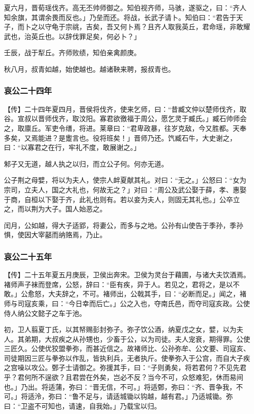 \documentclass[]{article}
\begin{document}
夏六月，晋荀瑶伐齐。高无丕帅师御之。知伯视齐师，马骇，遂驱之，曰：``齐人知余旗，其谓余畏而反也。」乃垒而还。将战，长武子请卜。知伯曰：``君告于天子，而卜之以守龟于宗祧，吉矣，吾又何卜焉？且齐人取我英丘，君命瑶，非敢耀武也，治英丘也。以辞伐罪足矣，何必卜？」

壬辰，战于犁丘。齐师败绩，知伯亲禽颜庚。

秋八月，叔青如越，始使越也。越诸鞅来聘，报叔青也。

\hypertarget{header-n3278}{%
\subsubsection{哀公二十四年}\label{header-n3278}}

【传】二十四年夏四月，晋侯将伐齐，使来乞师，曰：``昔臧文仲以楚师伐齐，取谷。宣叔以晋师伐齐，取汶阳。寡君欲徼福于周公，愿乞灵于臧氏。」臧石帅师会之，取廪丘。军吏令缮，将进。莱章曰：``君卑政暴，往岁克敌，今又胜都。天奉多矣，又焉能进？是躗言也。役将班矣！」晋师乃还。饩臧石牛，大史谢之，曰：``以寡君之在行，牢礼不度，敢展谢之。」

邾子又无道，越人执之以归，而立公子何。何亦无道。

公子荆之母嬖，将以为夫人，使宗人衅夏献其礼。对曰：``无之。」公怒曰：``女为宗司，立夫人，国之大礼也，何故无之？」对曰：``周公及武公娶于薛，孝、惠娶于商，自桓以下娶于齐，此礼也则有。若以妾为夫人，则固无其礼也。」公卒立之，而以荆为大子。国人始恶之。

闰月，公如越，得大子适郢，将妻公，而多与之地。公孙有山使告于季孙，季孙惧，使因大宰嚭而纳赂焉，乃止。

\hypertarget{header-n3285}{%
\subsubsection{哀公二十五年}\label{header-n3285}}

【传】二十五年夏五月庚辰，卫侯出奔宋。卫侯为灵台于藉圃，与诸大夫饮酒焉。褚师声子袜而登席，公怒，辞曰：``臣有疾，异于人。若见之，君将之，是以不敢。」公愈怒，大夫辞之，不可。褚师出，公戟其手，曰：``必断而足。」闻之，褚师与司寇亥乘，曰：``今日幸而后亡。」公之入也，夺南氏邑，而夺司寇亥政。公使侍人纳公文懿子之车于池。

初，卫人翦夏丁氏，以其帑赐彭封弥子。弥子饮公酒，纳夏戊之女，嬖，以为夫人。其弟期，大叔疾之从孙甥也，少畜于公，以为司徒。夫人宠衰，期得罪。公使三匠久。公使优狡盟拳弥，而甚近信之。故褚师比、公孙弥牟、公文要、司寇亥、司徒期因三匠与拳弥以作乱，皆执利兵，无者执斤。使拳弥入于公宫，而自大子疾之宫噪以攻公。鄄子士请御之。弥援其手，曰：``子则勇矣，将若君何？不见先君乎？君何所不逞欲？且君尝在外矣，岂必不反？当今不可，众怒难犯，休而易间也。」乃出。将适蒲，弥曰：``晋无信，不可。」将适鄄，弥曰：``齐、晋争我，不可。」将适泠，弥曰：``鲁不足与，请适城锄以钩越，越有君。」乃适城锄。弥曰：``卫盗不可知也，请速，自我始。」乃载宝以归。
\end{document}
